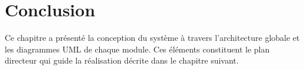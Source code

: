 \section*{Conclusion}

Ce chapitre a présenté la conception du système à travers l'architecture globale
et les diagrammes UML de chaque module. Ces éléments constituent le plan directeur
qui guide la réalisation décrite dans le chapitre suivant.
